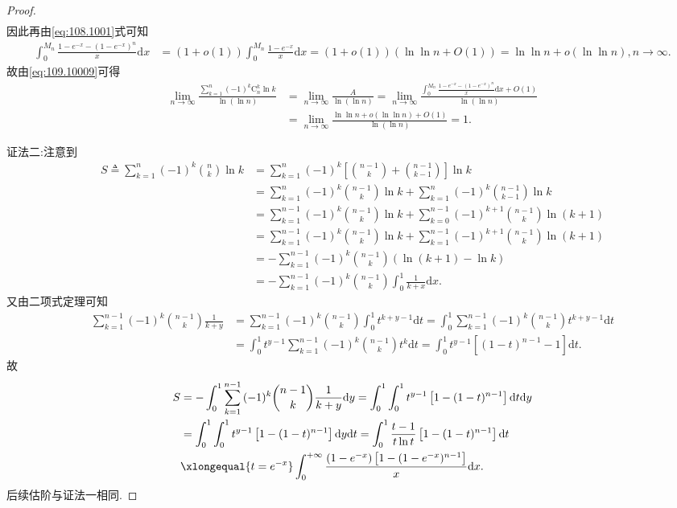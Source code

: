 \documentclass[../../main.tex]{subfiles}
\begin{document}
\begin{proof}
\begin{align*}
\end{align*}
因此再由\eqref{eq:108.1001}式可知
\begin{align*}
\int_0^{M_n}{\frac{1-e^{-x}-\left( 1-e^{-x} \right) ^n}{x}\mathrm{d}x}&=\left( 1+o\left( 1 \right) \right) \int_0^{M_n}{\frac{1-e^{-x}}{x}\mathrm{d}x}=\left( 1+o\left( 1 \right) \right) \left( \ln\ln n+O\left( 1 \right) \right) =\ln\ln n+o\left( \ln\ln n \right) ,n\rightarrow \infty .
\end{align*}
故由\eqref{eq:109.10009}可得
\begin{align*}
\lim_{n\rightarrow \infty} \frac{\sum\limits_{k=1}^n{\left( -1 \right) ^k\mathrm{C}_{n}^{k}\ln k}}{\ln \left( \ln n \right)}&=\lim_{n\rightarrow \infty} \frac{A}{\ln \left( \ln n \right)}=\lim_{n\rightarrow \infty} \frac{\int_0^{M_n}{\frac{1-e^{-x}-\left( 1-e^{-x} \right) ^n}{x}\mathrm{d}x}+O\left( 1 \right)}{\ln \left( \ln n \right)} \\
&=\lim_{n\rightarrow \infty} \frac{\ln\ln n+o\left( \ln\ln n \right) +O\left( 1 \right)}{\ln \left( \ln n \right)}=1.
\end{align*}

{\color{blue}证法二:}注意到
\begin{align*}
S\triangleq \sum_{k=1}^n{(-1) ^k\binom{n}{k}\ln k}&=\sum_{k=1}^n{(-1) ^k\left[\binom{n-1}{k}+\binom{n-1}{k-1}\right]\ln k}
\\
&=\sum_{k=1}^n{(-1) ^k\binom{n-1}{k}\ln k}+\sum_{k=1}^n{(-1) ^k\binom{n-1}{k-1}\ln k}
\\
&=\sum_{k=1}^{n-1}{(-1) ^k\binom{n-1}{k}\ln k}+\sum_{k=0}^{n-1}{(-1) ^{k+1}\binom{n-1}{k}\ln (k+1)}
\\
&=\sum_{k=1}^{n-1}{(-1) ^k\binom{n-1}{k}\ln k}+\sum_{k=1}^{n-1}{(-1) ^{k+1}\binom{n-1}{k}\ln (k+1)}
\\
&=-\sum_{k=1}^{n-1}{(-1) ^k\binom{n-1}{k}\left(\ln (k+1)-\ln k\right)}
\\
&=-\sum_{k=1}^{n-1}{(-1) ^k\binom{n-1}{k}\int_0^1{\frac{1}{k+x}\mathrm{d}x}}.
\end{align*}
又由二项式定理可知
\begin{align*}
\sum_{k=1}^{n-1}{(-1) ^k\binom{n-1}{k}\frac{1}{k+y}}&=\sum_{k=1}^{n-1}{(-1) ^k\binom{n-1}{k}\int_0^1{t^{k+y-1}\mathrm{d}t}}=\int_0^1{\sum_{k=1}^{n-1}{(-1) ^k\binom{n-1}{k}}t^{k+y-1}\mathrm{d}t}
\\
&=\int_0^1{t^{y-1}\sum_{k=1}^{n-1}{(-1) ^k\binom{n-1}{k}}t^k\mathrm{d}t}=\int_0^1{t^{y-1}\left[(1-t) ^{n-1}-1\right] \mathrm{d}t}.
\end{align*}
故
\begin{align*}
S&=-\int_0^1{\sum_{k=1}^{n-1}{(-1) ^k\binom{n-1}{k}\frac{1}{k+y}}\mathrm{d}y}=\int_0^1{\int_0^1{t^{y-1}\left[1-(1-t) ^{n-1}\right] \mathrm{d}t}\mathrm{d}y}
\\
&=\int_0^1{\int_0^1{t^{y-1}\left[1-(1-t) ^{n-1}\right] \mathrm{d}y}\mathrm{d}t}=\int_0^1{\frac{t-1}{t\ln t}\left[1-(1-t) ^{n-1}\right] \mathrm{d}t}
\\
&\xlongequal{t=e^{-x}}\int_0^{+\infty}{\frac{(1-e^{-x})\left[ 1-(1-e^{-x})^{n-1} \right]}{x}\mathrm{d}x}.
\end{align*}
后续估阶与证法一相同.


\end{proof}
\end{document}
